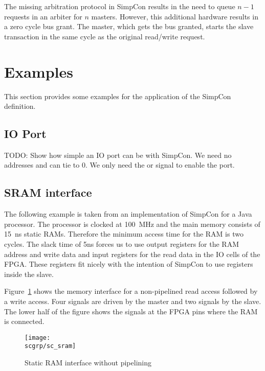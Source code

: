 The missing arbitration protocol in SimpCon results in the need to
queue $n-1$ requests in an arbiter for $n$ masters. However, this
additional hardware results in a zero cycle bus grant. The master,
which gets the bus granted, starts the slave transaction in the same
cycle as the original read/write request.



\section{Examples}

This section provides some examples for the application of the
SimpCon definition.

\subsection{IO Port}

TODO: Show how simple an IO port can be with SimpCon. We need no
addresses and can tie  to 0. We only need the
 or  signal to enable the port.

\subsection{SRAM interface}

The following example is taken from an implementation of SimpCon for
a Java processor. The processor is clocked at 100~MHz and the main
memory consists of 15~ns static RAMs. Therefore the minimum access
time for the RAM is two cycles. The slack time of 5ns forces us to
use output registers for the RAM address and write data and input
registers for the read data in the IO cells of the FPGA. These
registers fit nicely with the intention of SimpCon to use registers
inside the slave.

Figure~\ref{fig:sc:sram} shows the memory interface for a
non-pipelined read access followed by a write access. Four signals
are driven by the master and two signals by the slave. The lower
half of the figure shows the signals at the FPGA pins where the RAM
is connected.


\begin{figure}
    \centering
    \texttt{[image: \\scgrp/sc\_sram]}
    \caption{Static RAM interface without pipelining}
    \label{fig:sc:sram}
\end{figure}

